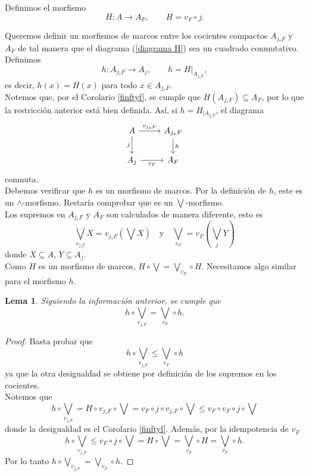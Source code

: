 \documentclass[11pt]{amsart}
\theoremstyle{plain}
\newtheorem{lem}[thm]{Lema}
\theoremstyle{definition}
\begin{document}
Definimos el morfismo 
\[
H\colon A\to A_F, \qquad H=v_F\circ j.
\]

Queremos definir un morfismos de marcos entre los cocientes compactos $A_{j_*F}$ y $A_F$ de tal manera que 
el diagrama (\ref{diagrama H}) sea un cuadrado conmutativo.\\

Definimos
\[
h\colon A_{j_*F}\to A_j, \qquad h=H|_{A_{j_*F}},
\]
es decir, $h(x)=H(x)$ para todo $x\in A_{j_*F}$.\\

Notemos que, por el Corolario \ref{finftyf}, se cumple que $H(A_{j_*F})\subseteq A_F$, por lo que la restricción anterior 
está bien definida. Así, si $h=H_{\mid{A_{j_*F}}}$, el diagrama 
\[\begin{tikzcd}
	A & {A_{j_*F}} \\
	{A_j} & {A_F}
	\arrow["{v_{j_*F}}", from=1-1, to=1-2]
	\arrow["j"', from=1-1, to=2-1]
	\arrow["h", from=1-2, to=2-2]
	\arrow["{v_F}"', from=2-1, to=2-2]
\end{tikzcd}\]
conmuta.\\

Debemos verificar que $h$ es un morfismo de marcos. Por la definición de $h$, este es un $\wedge$-morfismo. Restaría comprobar que es un $\bigvee$-morfismo.\\

Los supremos en $A_{j_*F}$ y $A_F$ son calculados de manera diferente, esto es
\[
\bigvee_{v_{j_*F}}X=v_{j_*F}(\bigvee X) \quad\text{y}\quad \bigvee_{v_F}=v_F(\bigvee_{j} Y)
\] 
donde $X\subseteq A$, $Y\subseteq A_j$.\\

Como $H$ es un morfismo de marcos, $H\circ \bigvee=\bigvee_{v_F}\circ H$. Necesitamos algo similar para el morfismo $h$.

\begin{lem}\label{bigvee g}
Siguiendo la información anterior, se cumple que
\[
h\circ \bigvee_{v_{j_*F}}=\bigvee_{v_F}\circ h.
\]
\end{lem}

\begin{proof}
Basta probar que 
\[
h\circ \bigvee_{v_{j_*F}}\leq \bigvee_{v_F}\circ h
\]
ya que la otra desigualdad se obtiene por definición de los supremos en los cocientes.\\

Notemos que
\[
h\circ \bigvee_{v_{j_*F}}=H\circ v_{j_*F}\circ \bigvee=v_F\circ j\circ v_{j_*F}\circ \bigvee\leq v_F\circ v_F\circ j\circ \bigvee
\]
donde la desigualdad es el Corolario \ref{finftyf}. Además, por la idempotencia de $v_F$ 
\[
h\circ\bigvee_{v_{j_*F}}\leq v_F\circ j\circ \bigvee =H\circ \bigvee=\bigvee_{v_F}\circ H=\bigvee_{v_F}\circ h.
\]
Por lo tanto $h\circ\bigvee_{v_{j_*F}}=\bigvee_{v_F}\circ h$.
\end{proof}
\end{document}
